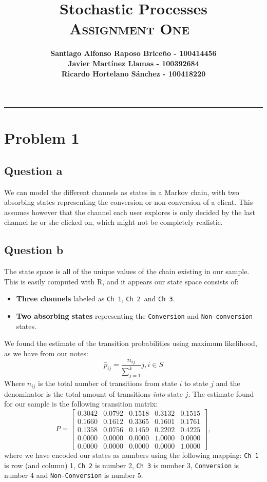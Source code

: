 \documentclass[11pt, a4paper]{article}
\title{\vspace{-8ex} \huge \bfseries Stochastic Processes\\
	\LARGE \normalfont \textsc{Assignment One} \vspace{-2ex}}
\author{\bfseries Santiago Alfonso Raposo Briceño - 100414456 \\
		\bfseries Javier Martínez Llamas - 100392684\\
		\bfseries Ricardo Hortelano Sánchez - 100418220}
\date{\vspace{-5ex}} %
\begin{document}
\maketitle
\hrule

\section{Problem 1}

\subsection{Question a}
We can model the different channels as states in a Markov chain, with two absorbing states representing the conversion or non-conversion of a client.
This assumes however that the channel each user explores is only decided by the last channel he or she clicked on, which might not be completely realistic.

\subsection{Question b}
The state space is all of the unique values of the chain existing in our sample. This is easily computed with R, and it appears our state space consists of:
\begin{itemize}
	\item \textbf{Three channels} labeled as \verb|Ch 1|, \verb|Ch 2| and \verb|Ch 3|.
	\item \textbf{Two absorbing states} representing the \verb|Conversion| and \verb|Non-conversion| states.
\end{itemize}

We found the estimate of the transition probabilities using maximum likelihood, as we have from our notes:
\[
	\hat p_{ij} = \frac{n_{ij}}{\sum_{j = 1}^{k}} j,i \in S
\]
Where $n_{ij}$ is the total number of transitions from state $i$ to state $j$ and the denominator is the total amount of transitions \emph{into} state $j$.
The estimate found for our sample is the following transition matrix:
\[
 P = \begin{bmatrix}
 	0.3042 & 0.0792 & 0.1518 & 0.3132 & 0.1515 \\
 	0.1660 & 0.1612 & 0.3365 & 0.1601 & 0.1761 \\
 	0.1358 & 0.0756 & 0.1459 & 0.2202 & 0.4225 \\
 	0.0000 & 0.0000 & 0.0000 & 1.0000 & 0.0000 \\
 	0.0000 & 0.0000 & 0.0000 & 0.0000 & 1.0000
 \end{bmatrix},
\]
where we have encoded our states as numbers using the following mapping: \verb|Ch 1| is row (and column) 1, \verb|Ch 2| is number 2, \verb|Ch 3| is number 3, \verb|Conversion| is number 4 and \verb|Non-Conversion| is number 5.
\end{document}
